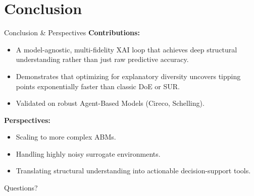 \documentclass[10pt, aspectratio=169]{beamer}
\begin{document}
\section{Conclusion}

\begin{frame}{Conclusion \& Perspectives}
  \textbf{Contributions:}
  \begin{itemize}
      \item A model-agnostic, multi-fidelity XAI loop that achieves deep structural understanding rather than just raw predictive accuracy.
      \item Demonstrates that optimizing for explanatory diversity uncovers tipping points exponentially faster than classic DoE or SUR.
      \item Validated on robust Agent-Based Models (Cireco, Schelling).
  \end{itemize}
  
  \vspace{0.5cm}
  \textbf{Perspectives:}
  \begin{itemize}
      \item Scaling to more complex ABMs.
      \item Handling highly noisy surrogate environments.
      \item Translating structural understanding into actionable decision-support tools.
  \end{itemize}
\end{frame}

\begin{frame}[standout]
  Questions?
\end{frame}
\end{document}
